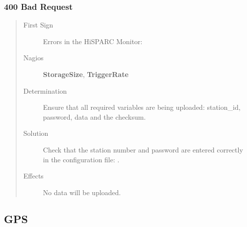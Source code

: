 \documentclass[a4paper,11pt,english]{sphinxmanual}
\begin{document}
\subsubsection{400 Bad Request}
\label{known-issues:bad-request}\begin{quote}\begin{description}
\item[{First Sign}] \leavevmode
Errors in the HiSPARC Monitor: 

\item[{Nagios}] \leavevmode
\textbf{StorageSize}, \textbf{TriggerRate}

\item[{Determination}] \leavevmode
Ensure that all required variables are being uploaded: station\_id, password, data and the checksum.

\item[{Solution}] \leavevmode
Check that the station number and password are entered correctly in the configuration file: .

\item[{Effects}] \leavevmode
No data will be uploaded.

\end{description}\end{quote}


\subsection{GPS}
\label{known-issues:gps}
\end{document}
